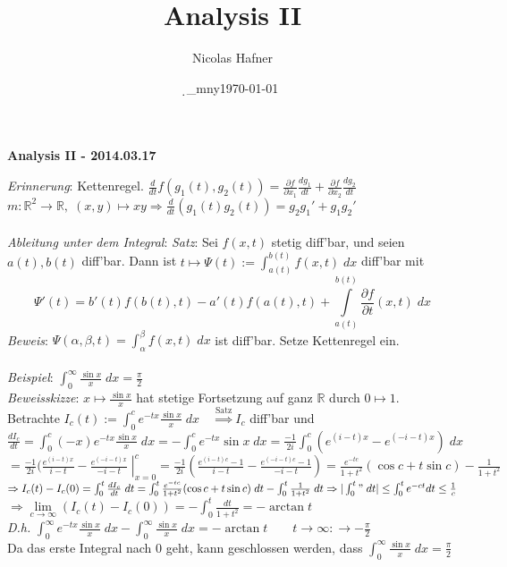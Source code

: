 \documentclass[12pt,a4paper,titlepage]{article}
\author{Nicolas Hafner}
\title{Analysis II}
\date{\d_mny\today}
\renewcommand{\d}{\partial}
\newcommand{\setR}{\mathbb{R}}
\begin{document}
	
\begin{center}{\bfseries\Huge Analysis II - 2014.03.17}\end{center}
\textit{Erinnerung}: Kettenregel. $\frac{d}{dt}f(g_1(t),g_2(t))=\frac{\d f}{\d x_1}\frac{dg_1}{dt}+\frac{\d f}{\d x_2}\frac{dg_2}{dt}$ \\
$m:\setR^2\to\setR,\; (x,y)\mapsto xy \Rightarrow \frac{d}{dt}(g_1(t)g_2(t))=g_2g_1'+g_1g_2'$ \\
\\
\textit{Ableitung unter dem Integral}: \textit{Satz}: Sei $f(x,t)$ stetig diff'bar, und seien $a(t),b(t)$ diff'bar. Dann ist $t\mapsto\Psi(t):=\int_{a(t)}^{b(t)}f(x,t) \;dx$ diff'bar mit
$$\Psi'(t)=b'(t)f(b(t),t)-a'(t)f(a(t),t)+\int\limits_{a(t)}^{b(t)}\frac{\d f}{\d t}(x,t) \;dx$$
\textit{Beweis}: $\Psi(\alpha,\beta,t)=\int_\alpha^\beta f(x,t) \;dx$ ist diff'bar. Setze Kettenregel ein. \\
\\
\textit{Beispiel}: $\int_0^\infty \frac{\sin x}{x} \;dx = \frac{\pi}{2}$ \\
\textit{Beweisskizze}: $x\mapsto\frac{\sin x}{x}$ hat stetige Fortsetzung auf ganz $\setR$ durch $0\mapsto 1$. \\
Betrachte $I_c(t):=\int_0^ce^{-tx}\frac{\sin x}{x} \;dx \quad \overset{\text{Satz}}{\Rightarrow} I_c$ diff'bar und \\
$\frac{dI_c}{dt}=\int_0^c(-x)e^{-tx}\frac{\sin x}{x} \;dx = -\int_0^ce^{-tx}\sin x \;dx =\frac{-1}{2i}\int_0^c(e^{(i-t)x}-e^{(-i-t)x}) \;dx$ \\
$= \frac{-1}{2i}\left.(\frac{e^{(i-t)x}}{i-t}-\frac{e^{(-i-t)x}}{-i-t} \;\right|_{x=0}^c = \frac{-1}{2i}(\frac{e^{(i-t)c}-1}{i-t}-\frac{e^{(-i-t)c}-1}{-i-t}) = \frac{e^{-tc}}{1+t^2}(\cos c+t\sin c)-\frac{1}{1+t^2}$ \\
$\Rightarrow I_c(t)-I_c(0)=\int_0^t\frac{dI_c}{dt} \;dt = \int_0^t\frac{e^{-tc}}{1+t^2}(\cos c+t\sin c) \;dt-\int_0^t\frac{1}{1+t^2} \;dt \Rightarrow |\int_0^t" \;dt|\leq \int_0^te^{-ct}{dt}\leq\frac{1}{c}$ \\
$\Rightarrow \lim\limits_{c\to\infty}(I_c(t)-I_c(0))=-\int_0^t\frac{dt}{1+t^2}=-\arctan t$ \\
\textit{D.h.} $\int_0^\infty e^{-tx}\frac{\sin x}{x} \;dx-\int_0^\infty \frac{\sin x}{x} \;dx = -\arctan t \quad\quad t\to\infty: \to-\frac{\pi}{2}$ \\
Da das erste Integral nach $0$ geht, kann geschlossen werden, dass $\int_0^\infty \frac{\sin x}{x} \;dx=\frac{\pi}{2}$ 
\end{document}
